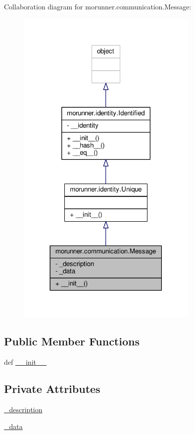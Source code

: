 Collaboration diagram for morunner.\+communication.\+Message\+:
\nopagebreak
\begin{figure}[H]
\begin{center}
\leavevmode
\includegraphics[width=249pt]{classmorunner_1_1communication_1_1Message__coll__graph}
\end{center}
\end{figure}
\subsection*{Public Member Functions}
\begin{DoxyCompactItemize}
\item 
def \hyperlink{classmorunner_1_1communication_1_1Message_a4f10c83eae9c4899e31ddae252687899}{\+\_\+\+\_\+init\+\_\+\+\_\+}
\end{DoxyCompactItemize}
\subsection*{Private Attributes}
\begin{DoxyCompactItemize}
\item 
\hyperlink{classmorunner_1_1communication_1_1Message_a7645e37f561610793530a6c329ab55fe}{\+\_\+description}
\item 
\hyperlink{classmorunner_1_1communication_1_1Message_a1735c0a988d7a81371b188d36913da1c}{\+\_\+data}
\end{DoxyCompactItemize}


